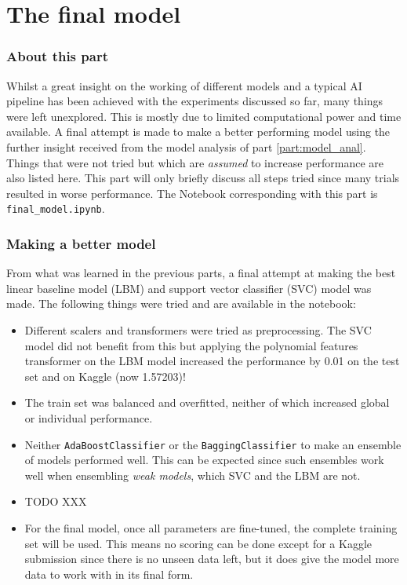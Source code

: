 \part{The final model}
\label{part:final_model}


\section{About this part}
\label{section:opt_about_part}

Whilst a great insight on the working of different models and a typical AI pipeline has been achieved with the experiments discussed so far, many things were left unexplored.
This is mostly due to limited computational power and time available.
A final attempt is made to make a better performing model using the further insight received from the model analysis of part \ref{part:model_anal}.
Things that were not tried but which are \textit{assumed} to increase performance are also listed here.
This part will only briefly discuss all steps tried since many trials resulted in worse performance.
The Notebook corresponding with this part is \texttt{final\_model.ipynb}.


\section{Making a better model}
\label{section:opt_better_model}

From what was learned in the previous parts, a final attempt at making the best linear baseline model (LBM) and support vector classifier (SVC) model was made.
The following things were tried and are available in the notebook:
\begin{itemize}
    \item Different scalers and transformers were tried as preprocessing. The SVC model did not benefit from this but applying the polynomial features transformer on the LBM model increased the performance by 0.01 on the test set and on Kaggle (now 1.57203)!
    \item The train set was balanced and overfitted, neither of which increased global or individual performance. 
    \item Neither \texttt{AdaBoostClassifier} or the \texttt{BaggingClassifier} to make an ensemble of models performed well. This can be expected since such ensembles work well when ensembling \textit{weak models}, which SVC and the LBM are not.
    \item TODO XXX 
    \item For the final model, once all parameters are fine-tuned, the complete training set will be used. This means no scoring can be done except for a Kaggle submission since there is no unseen data left, but it does give the model more data to work with in its final form. 
\end{itemize}

